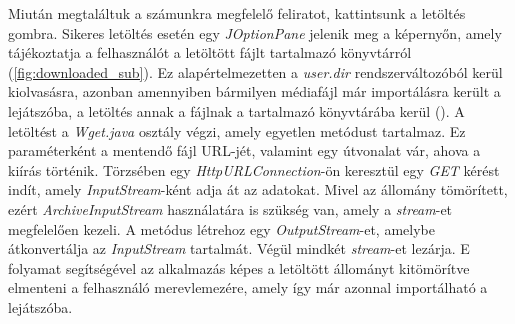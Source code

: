 Miután megtaláltuk a számunkra megfelelő feliratot, kattintsunk a letöltés gombra. Sikeres letöltés esetén egy \textit{JOptionPane} jelenik meg a képernyőn, amely tájékoztatja a felhasználót a letöltött fájlt tartalmazó könyvtárról (\ref{fig:downloaded_sub}). Ez alapértelmezetten a \textit{user.dir} rendszerváltozóból kerül kiolvasásra, azonban amennyiben bármilyen médiafájl már importálásra került a lejátszóba, a letöltés annak a fájlnak a tartalmazó könyvtárába kerül (). A letöltést a \textit{Wget.java} osztály végzi, amely egyetlen metódust tartalmaz. Ez paraméterként a mentendő fájl URL-jét, valamint egy útvonalat vár, ahova a kiírás történik. Törzsében egy \textit{HttpURLConnection}-ön keresztül egy \textit{GET} kérést indít, amely \textit{InputStream}-ként adja át az adatokat. Mivel az állomány tömörített, ezért \textit{ArchiveInputStream} használatára is szükség van, amely a \textit{stream}-et megfelelően kezeli. A metódus létrehoz egy \textit{OutputStream}-et, amelybe átkonvertálja az \textit{InputStream} tartalmát. Végül mindkét \textit{stream}-et lezárja. E folyamat segítségével az alkalmazás képes a letöltött állományt kitömörítve elmenteni a felhasználó merevlemezére, amely így már azonnal importálható a lejátszóba.